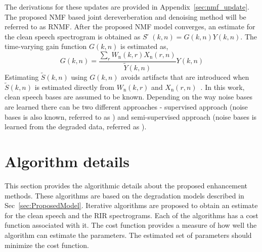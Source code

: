 The derivations for these updates are provided in Appendix~\ref{sec:nmf_update}. The proposed NMF based joint dereverberation and denoising method will be referred to as RNMF. After the proposed NMF model converges, an estimate for the clean speech spectrogram is
obtained as $S̃(k,n)=G(k,n)Y(k,n)$. The time-varying gain function $G(k,n)$ is estimated as,
\begin{equation}
G(k,n)=\dfrac{\sum_r W_{\text{n}}(k,r)X_{\text{n}}(r,n)}{\tilde{Y}(k,n)}Y(k,n)
\label{eq:gain_function}
\end{equation}
Estimating $\tilde{S}(k,n)$ using $G(k,n)$ avoids artifacts that are introduced when $\tilde{S}(k,n)$ is estimated directly from $W_{\text{n}}(k,r)$ and $X_{\text{n}}(r,n)$~\cite{mohammadiha2016speech}. In this work, clean speech bases are assumed to be known. Depending on the way noise bases are learned there can be two different approaches - supervised approach (noise bases is also known, referred to as ) and semi-supervised approach (noise bases is learned from the degraded data, referred as ).

\iffalse
\section{Algorithm details}
\label{sec:cost_fn}
This section provides the algorithmic details about the proposed enhancement methods. These algorithms are based on the degradation models described in Sec~\ref{sec:ProposedModel}. Iterative algorithms are proposed to obtain an estimate for the clean speech and the RIR spectrograms. Each of the algorithms has a cost function associated with it. The cost function provides a measure of how well the algorithm can estimate the parameters. The estimated set of parameters should minimize the cost function. 

